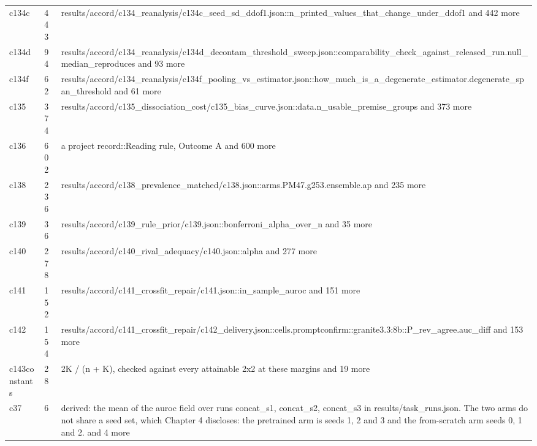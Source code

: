 \begin{longtable}{@{}p{1.6in}p{0.6in}p{3.6in}@{}}
c134c & 443 & results/\allowbreak{}accord/\allowbreak{}c134\_reanalysis/\allowbreak{}c134c\_seed\_sd\_ddof1.\allowbreak{}json::n\_printed\_values\_that\_change\_under\_ddof1 and 442 more\\
c134d & 94 & results/\allowbreak{}accord/\allowbreak{}c134\_reanalysis/\allowbreak{}c134d\_decontam\_threshold\_sweep.\allowbreak{}json::comparability\_check\_against\_released\_run.\allowbreak{}null\_median\_reproduces and 93 more\\
c134f & 62 & results/\allowbreak{}accord/\allowbreak{}c134\_reanalysis/\allowbreak{}c134f\_pooling\_vs\_estimator.\allowbreak{}json::how\_much\_is\_a\_degenerate\_estimator.\allowbreak{}degenerate\_span\_threshold and 61 more\\
c135 & 374 & results/\allowbreak{}accord/\allowbreak{}c135\_dissociation\_cost/\allowbreak{}c135\_bias\_curve.\allowbreak{}json::data.\allowbreak{}n\_usable\_premise\_groups and 373 more\\
c136 & 602 & a project record::Reading rule, Outcome A and 600 more\\
c138 & 236 & results/\allowbreak{}accord/\allowbreak{}c138\_prevalence\_matched/\allowbreak{}c138.\allowbreak{}json::arms.\allowbreak{}PM47.\allowbreak{}g253.\allowbreak{}ensemble.\allowbreak{}ap and 235 more\\
c139 & 36 & results/\allowbreak{}accord/\allowbreak{}c139\_rule\_prior/\allowbreak{}c139.\allowbreak{}json::bonferroni\_alpha\_over\_n and 35 more\\
c140 & 278 & results/\allowbreak{}accord/\allowbreak{}c140\_rival\_adequacy/\allowbreak{}c140.\allowbreak{}json::alpha and 277 more\\
c141 & 152 & results/\allowbreak{}accord/\allowbreak{}c141\_crossfit\_repair/\allowbreak{}c141.\allowbreak{}json::in\_sample\_auroc and 151 more\\
c142 & 154 & results/\allowbreak{}accord/\allowbreak{}c141\_crossfit\_repair/\allowbreak{}c142\_delivery.\allowbreak{}json::cells.\allowbreak{}promptconfirm::granite3.\allowbreak{}3:8b::P\_rev\_agree.\allowbreak{}auc\_diff and 153 more\\
c143constants & 28 & 2K /\allowbreak{} (n + K), checked against every attainable 2x2 at these margins and 19 more\\
c37 & 6 & derived: the mean of the auroc field over runs concat\_s1, concat\_s2, concat\_s3 in results/\allowbreak{}task\_runs.\allowbreak{}json.\allowbreak{} The two arms do not share a seed set, which Chapter 4 discloses: the pretrained arm is seeds 1, 2 and 3 and the from-scratch arm seeds 0, 1 and 2.\allowbreak{} and 4 more\\

\end{longtable}
